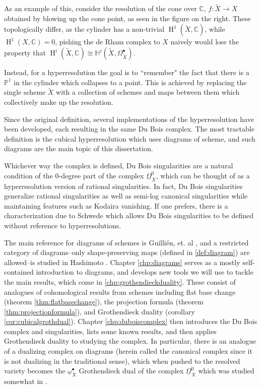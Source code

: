 \documentclass[proquest]{uwthesis}[2014/11/13]
\theoremstyle{definition}
\DeclareMathOperator{\Ho}{H}
\newcommand{\CC}{\mathbb{C}}
\newcommand{\HH}{\mathbb{H}}
\newcommand{\PP}{\mathbb{P}}
\newcommand{\DB}{\underline{\Omega}}
\newcommand{\db}{\underline{\omega}^\bullet}
\begin{document}
As an example of this, consider the resolution of the cone over $\CC$, $f : \tilde{X} \rightarrow X$ obtained by blowing up the cone point, as seen in the figure on the right.
These topologically differ, as the cylinder has a non-trivial $\Ho^1 (\tilde{X}, \CC)$, while $\Ho^1 (X, \CC) = 0$, pishing the de Rham complex to $X$ naively would lose the property that $\Ho^i ( \tilde{X}, \CC) \cong \HH^i (\tilde{X}, \Omega_{\tilde{X}}^\bullet)$.

Instead, for a hyperresolution the goal is to ``remember" the fact that there is a $\PP^1$ in the cylinder which collapses to a point.
This is achieved by replacing the single scheme $\tilde{X}$ with a collection of schemes and maps between them which collectively make up the resolution.

Since the original definition, several implementations of the hyperresolution have been developed, each resulting in the same Du Bois complex. The most tractable definition is the cubical hyperresolution which uses diagrams of scheme, and such diagrams are the main topic of this dissertation.

Whichever way the complex is defined, Du Bois singularities are a natural condition of the 0-degree part of the complex $\DB_X^0$, which can be thought of as a hyperresolution version of rational singularities. In fact, Du Bois singularities generalize rational singularities as well as semi-log canonical singularities while maintaining features such as Kodaira vanishing.
If one prefers, there is a characterization due to Schwede \cite{Schwede2007} which allows Du Bois singularities to be defined without reference to hyperresolutions.

The main reference for diagrams of schemes is Guilli\'en, et. al \cite{Guillen1988}, and a restricted category of diagrams--only shape-preserving maps (defined in \ref{def:diagram}) are allowed--is studied in Hashimoto \cite{Lipman2009}.
Chapter \ref{chp:diagrams} serves as a mostly self-contained introduction to diagrams, and develops new tools we will use to tackle the main results, which come in \ref{chp:grothendieckduality}. These consist of analogues of cohomological results from schemes including flat base change (theorem \ref{thm:flatbasechange}), the projection formula (theorem \ref{thm:projectionformula}), and Grothendieck duality (corollary \ref{cor:cubicalgrothdual}). Chapter \ref{chp:duboiscomplex} then introduces the Du Bois complex and singularities, lists some known results, and then applies Grothendieck duality to studying the complex. In particular, there is an analogue of a dualizing complex on diagrams (herein called the canonical complex since it is not dualizing in the traditional sense), which when pushed to the resolved variety becomes the $\db_X$ Grothendieck dual of the complex $\DB_X^0$ which was studied somewhat in \cite{Kovacs2011a}.
\end{document}
